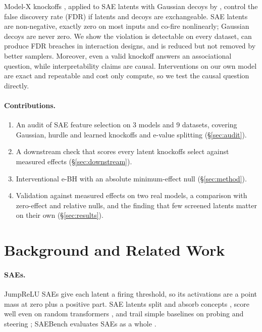 Model-X knockoffs \citep{candes2018panning}, applied to SAE latents with Gaussian decoys by
\citet{enkhbayar2025}, control the false discovery rate (FDR) if latents and decoys are exchangeable.
SAE latents are non-negative, exactly zero on most inputs and co-fire nonlinearly; Gaussian decoys are
never zero. We show the violation is detectable on every dataset, can produce FDR breaches in interaction designs, and
is reduced but not removed by better samplers. Moreover, even a valid knockoff answers an associational question, while interpretability
claims are causal. Interventions on our own model are exact and repeatable and cost only compute, so we test the causal
question directly.

\paragraph{Contributions.}
\begin{enumerate}[leftmargin=*,itemsep=1pt,topsep=2pt]
  \item An audit of SAE feature selection on 3 models and 9 datasets, covering Gaussian, hurdle and learned knockoffs
        and e-value splitting (\S\ref{sec:audit}).
  \item A downstream check that scores every latent knockoffs select against measured effects (\S\ref{sec:downstream}).
  \item Interventional e-BH with an absolute minimum-effect null (\S\ref{sec:method}).
  \item Validation against measured effects on two real models, a comparison with zero-effect and relative nulls,
        and the finding that few screened latents matter on their own (\S\ref{sec:results}).
\end{enumerate}

\section{Background and Related Work}
\label{sec:background}

\paragraph{SAEs.} JumpReLU SAEs \citep{rajamanoharan2024jumping, lieberum2024gemma} give each latent a
firing threshold, so its activations are a point mass at zero plus a positive part. SAE latents split
and absorb concepts \citep{chanin2024absorption}, score well even on random transformers
\citep{heap2025random}, and trail simple baselines on probing and steering
\citep{kantamneni2025sparse, wu2025axbench}; SAEBench evaluates SAEs as a whole
\citep{karvonen2025saebench}.

